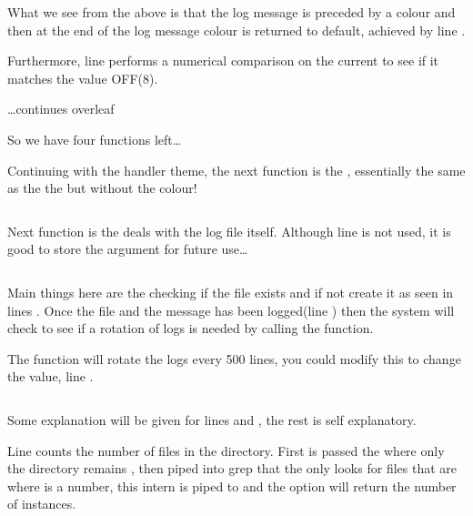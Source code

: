 \documentclass{article}
\begin{document}
\inputminted[frame=single,firstline=159,lastline=173,linenos]{bash}{rfclogger.sh}
What we see from the above is that the log message is preceded by a colour and then at the end of the log message colour is returned to default, achieved by line .

Furthermore, line  performs a numerical comparison on the current  to see if it matches the value OFF(8).

\begin{center}
    \vspace{4em}\ldots continues overleaf
\end{center}
\clearpage

So we have four functions left\ldots

Continuing with the handler theme, the next function is the , essentially the same as the the  but without the colour!

\inputminted[frame=single,firstline=175,lastline=186,linenos]{bash}{rfclogger.sh}

Next function is the deals with the log file itself. Although line  is not used, it is good to store the argument for future use\ldots

\inputminted[frame=single,firstline=188,lastline=198,linenos]{bash}{rfclogger.sh}

Main things here are the checking if the file exists and if not create it as seen in lines . Once the file and the message has been logged(line ) then the system will check to see if a rotation of logs is needed by calling the  function.

The  function will rotate the logs every 500 lines, you could modify this to change the value, line .

\inputminted[frame=single,firstline=200,lastline=214,linenos]{bash}{rfclogger.sh}

Some explanation will be given for lines  and , the rest is self explanatory.

Line  counts the number of files in the directory. First  is passed the  where only the directory remains \code{\%/*}, then piped \code{|} into grep that the only looks for files that are  where \code{\#} is a number, this intern is piped to  and the option  will return the number of instances.
\end{document}
